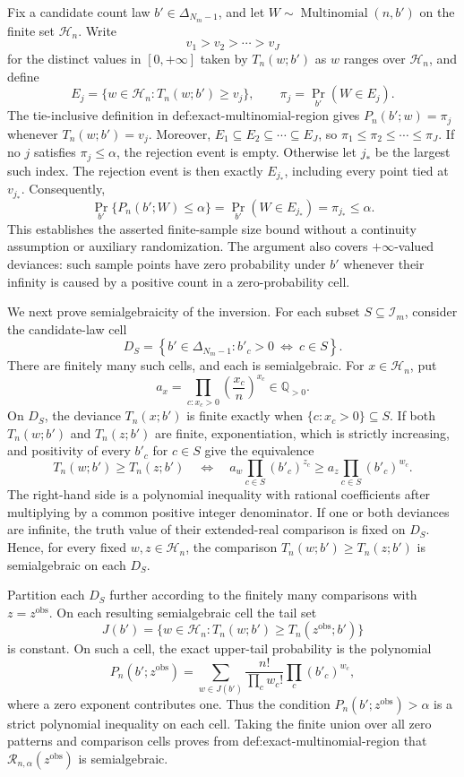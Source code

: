 Fix a candidate count law \(b'\in\Delta_{N_m-1}\), and let \(W\sim\operatorname{Multinomial}(n,b')\) on the finite set \(\mathcal H_n\).  Write
\[
 v_1>v_2>\cdots>v_J
\]
for the distinct values in \([0,+\infty]\) taken by \(T_n(w;b')\) as \(w\) ranges over \(\mathcal H_n\), and define
\[
 E_j=\{w\in\mathcal H_n:T_n(w;b')\geq v_j\},
 \qquad \pi_j=\Pr_{b'}(W\in E_j).
\tag{1}
\]
The tie-inclusive definition in def:exact-multinomial-region gives \(P_n(b';w)=\pi_j\) whenever \(T_n(w;b')=v_j\).  Moreover, \(E_1\subseteq E_2\subseteq\cdots\subseteq E_J\), so \(\pi_1\leq\pi_2\leq\cdots\leq\pi_J\).  If no \(j\) satisfies \(\pi_j\leq\alpha\), the rejection event is empty.  Otherwise let \(j_*\) be the largest such index.  The rejection event is then exactly \(E_{j_*}\), including every point tied at \(v_{j_*}\).  Consequently,
\[
 \Pr_{b'}\{P_n(b';W)\leq\alpha\}
 =\Pr_{b'}(W\in E_{j_*})
 =\pi_{j_*}\leq\alpha.
\tag{2}
\]
This establishes the asserted finite-sample size bound without a continuity assumption or auxiliary randomization.  The argument also covers \(+\infty\)-valued deviances: such sample points have zero probability under \(b'\) whenever their infinity is caused by a positive count in a zero-probability cell.

We next prove semialgebraicity of the inversion.  For each subset \(S\subseteq\mathcal I_m\), consider the candidate-law cell
\[
 D_S=\left\{b'\in\Delta_{N_m-1}:b'_c>0\ \Longleftrightarrow\ c\in S\right\}.
\tag{3}
\]
There are finitely many such cells, and each is semialgebraic.  For \(x\in\mathcal H_n\), put
\[
 a_x=\prod_{c:x_c>0}\left(\frac{x_c}{n}\right)^{x_c}\in\mathbb Q_{>0}.
\tag{4}
\]
On \(D_S\), the deviance \(T_n(x;b')\) is finite exactly when \(\{c:x_c>0\}\subseteq S\).  If both \(T_n(w;b')\) and \(T_n(z;b')\) are finite, exponentiation, which is strictly increasing, and positivity of every \(b'_c\) for \(c\in S\) give the equivalence
\[
 T_n(w;b')\geq T_n(z;b')
 \quad\Longleftrightarrow\quad
 a_w\prod_{c\in S}(b'_c)^{z_c}
 \geq
 a_z\prod_{c\in S}(b'_c)^{w_c}.
\tag{5}
\]
The right-hand side is a polynomial inequality with rational coefficients after multiplying by a common positive integer denominator.  If one or both deviances are infinite, the truth value of their extended-real comparison is fixed on \(D_S\).  Hence, for every fixed \(w,z\in\mathcal H_n\), the comparison \(T_n(w;b')\geq T_n(z;b')\) is semialgebraic on each \(D_S\).

Partition each \(D_S\) further according to the finitely many comparisons with \(z=z^{\mathrm{obs}}\).  On each resulting semialgebraic cell the tail set
\[
 J(b')=\{w\in\mathcal H_n:T_n(w;b')\geq T_n(z^{\mathrm{obs}};b')\}
\]
is constant.  On such a cell, the exact upper-tail probability is the polynomial
\[
 P_n(b';z^{\mathrm{obs}})
 =\sum_{w\in J(b')}
   \frac{n!}{\prod_c w_c!}\prod_c(b'_c)^{w_c},
\tag{6}
\]
where a zero exponent contributes one.  Thus the condition \(P_n(b';z^{\mathrm{obs}})>\alpha\) is a strict polynomial inequality on each cell.  Taking the finite union over all zero patterns and comparison cells proves from def:exact-multinomial-region that \(\mathcal R_{n,\alpha}(z^{\mathrm{obs}})\) is semialgebraic.

